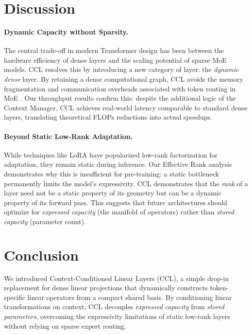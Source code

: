 \documentclass[11pt]{article}
\begin{document}
\section{Discussion}

\paragraph{Dynamic Capacity without Sparsity.}
The central trade-off in modern Transformer design has been between the hardware efficiency of dense layers and the scaling potential of sparse MoE models. CCL resolves this by introducing a new category of layer: the \textit{dynamic dense} layer. By retaining a dense computational graph, CCL avoids the memory fragmentation and communication overheads associated with token routing in MoE \cite{fedus2022switch}. Our throughput results confirm this: despite the additional logic of the Context Manager, CCL achieves real-world latency comparable to standard dense layers, translating theoretical FLOPs reductions into actual speedups.

\paragraph{Beyond Static Low-Rank Adaptation.}
While techniques like LoRA \cite{hu2021lora} have popularized low-rank factorization for adaptation, they remain static during inference. Our Effective Rank analysis demonstrates why this is insufficient for pre-training: a static bottleneck permanently limits the model's expressivity. CCL demonstrates that the \textit{rank} of a layer need not be a static property of its geometry but can be a dynamic property of its forward pass. This suggests that future architectures should optimize for \textit{expressed capacity} (the manifold of operators) rather than \textit{stored capacity} (parameter count).

\section{Conclusion}

We introduced Context-Conditioned Linear Layers (CCL), a simple drop-in replacement for dense linear projections that dynamically constructs token-specific linear operators from a compact shared basis. By conditioning linear transformations on context, CCL decouples \emph{expressed capacity} from \emph{stored parameters}, overcoming the expressivity limitations of static low-rank layers without relying on sparse expert routing.
\end{document}
